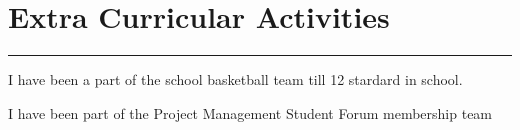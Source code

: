 \documentclass[]{rahulworld-resume}
\begin{document}
\begin{minipage}[t]{0.57\textwidth}
\section{Extra Curricular Activities} %
\noindent\rule{11cm}{0.4pt}
 
\descript{}
\noindent
\hspace{5em}%
\begin{minipage}{0.85\textwidth\vspace{5pt}}
I have been a part of the school basketball team till 12 stardard in school.
\end{minipage}
 
\noindent
\hspace{5em}%
\begin{minipage}{0.85\textwidth\vspace{5pt}}
I have been part of the Project Management Student Forum membership team
\end{minipage}
\end{minipage} 
\end{document}
